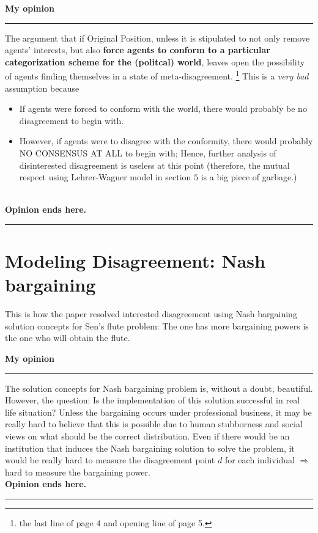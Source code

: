 \documentclass[a4paper,11pt]{article}
\newcommand{\note}[1]{\textsl{#1}}
\newcommand{\bold}[1]{\textbf{#1}}
\begin{document}
  \medskip
  \bold{My opinion}\rule{10cm}{0.4pt}
  The argument that if Original Position, unless it is stipulated
  to not only remove agents' interests, but also \bold{force agents
  to conform to a particular categorization scheme for
  the (politcal) world}, leaves open the possibility of agents
  finding themselves in a state of meta-disagreement.%
  \footnote{the last line of page 4 and opening line of page 5.}
  This is a \note{very bad} assumption because
  \begin{itemize}
    \item If agents were forced to conform with the world,
    there would probably be no disagreement to begin with.
    \item However, if agents were to disagree with the
    conformity, there would probably NO CONSENSUS AT ALL
    to begin with; Hence, further analysis of disinterested
    disagreement is useless at this point (therefore,
    the mutual respect using Lehrer-Wagner model in section
    $5$ is a big piece of garbage.)
  \end{itemize}
  \\
  \bold{Opinion ends here.}\rule{10cm}{0.4pt}

  \medskip
  \section{Modeling Disagreement: Nash bargaining}
  This is how the paper resolved interested disagreement
  using Nash bargaining solution concepts for Sen's flute
  problem: The one has more bargaining powers is the one
  who will obtain the flute.

  \medskip
  \bold{My opinion}\rule{10cm}{0.4pt}
  The solution concepts for Nash bargaining problem is,
  without a doubt, beautiful. However, the question: Is
  the implementation of this solution successful in real life
  situation? Unless the bargaining occurs under professional
  business, it may be really hard to believe that this is
  possible due to human stubborness and social views on
  what should be the correct distribution. Even if there would
  be an institution that induces the Nash bargaining solution
  to solve the problem, it would be really hard to measure
  the disagreement point $d$ for each individual $\Rightarrow$
  hard to measure the bargaining power.
  \\
  \bold{Opinion ends here.}\rule{10cm}{0.4pt}
\end{document}
